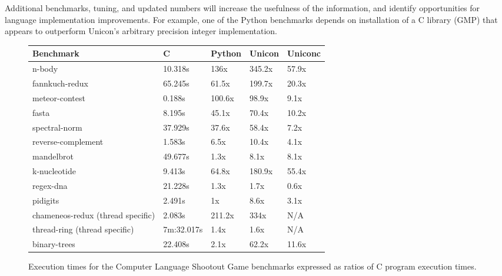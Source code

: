 \documentclass[letterpaper,12pt]{article}
\newcommand{\squeezeup}{\vspace{-1em}}
\begin{document}
Additional benchmarks, tuning, and updated numbers will
increase the usefulness of the information, and identify opportunities
for language implementation improvements. For example, one of the
Python benchmarks depends on installation of a C library (GMP) that
appears to outperform Unicon's arbitrary precision integer
implementation.

\begin{figure}[h]
  \begin{center}
    {\footnotesize
      \begin{tabularx}{.63\textwidth}{ | p{2.5cm} | p{1.7cm} | p{1.3cm} | p{1.3cm} | X |}
        \hline
        Benchmark & 
        C & 
        Python & 
        Unicon &
        Uniconc
        \\ \hline
        n-body &
        10.318s &
        136x &
        345.2x &
        57.9x 
        \\ \hline
        fannkuch-redux &
        65.245s &
        61.5x &
        199.7x &
        20.3x 
        \\ \hline
        meteor-contest &
        0.188s &
        100.6x &
        98.9x &
        9.1x
        \\ \hline
        fasta &
        8.195s &
        45.1x &
        70.4x &
        10.2x 
        \\ \hline
        spectral-norm &
        37.929s &
        37.6x &
        58.4x &
        7.2x 
        \\ \hline
        reverse-complement &
        1.583s &
        6.5x &
        10.4x &
        4.1x
        \\ \hline
        mandelbrot &
        49.677s &
        1.3x &
        8.1x &
        8.1x
        \\ \hline
        k-nucleotide &
        9.413s &
        64.8x &
        180.9x &
        55.4x
        \\ \hline
        regex-dna &
        21.228s &
        1.3x &
        1.7x &
        0.6x
        \\ \hline
        pidigits &
        2.491s &
        1x &
        8.6x &
        3.1x
        \\ \hline
        chameneos-redux \newline (thread specific) &
        2.083s &
        211.2x &
        334x &
        N/A
        \\ \hline
        thread-ring \newline (thread specific) &
        7m:32.017s &
        1.4x &
        1.6x &
        N/A
        \\ \hline
        binary-trees &
        22.408s &
        2.1x &
        62.2x &
        11.6x
        \\ \hline
      \end{tabularx}
    }
    \vspace{-4mm}
  \end{center}
  \caption{Execution times for the Computer Language Shootout
    Game benchmarks expressed as ratios of C program execution times.}
  \label{fig}
  \squeezeup
\end{figure}
\end{document}
